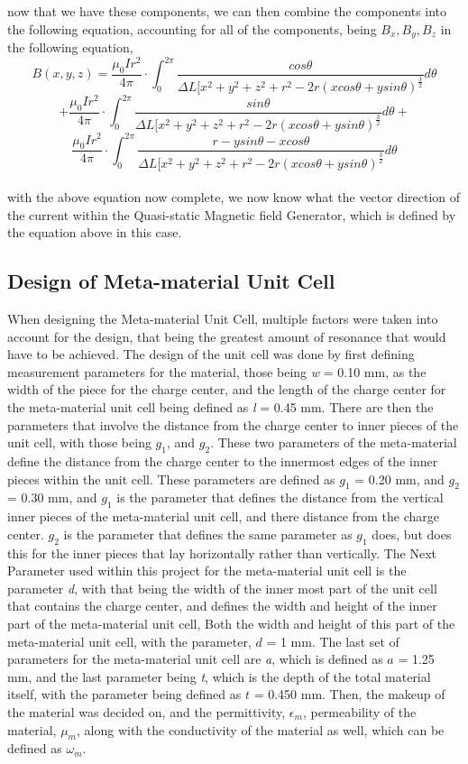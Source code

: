 \documentclass[]{article}
\begin{document}
now that we have these components, we can then combine the components into the following equation, accounting for all of the components, being $B_x, B_y, B_z$ in the following equation,
\\
\[B(x,y,z) = \frac{\mu_0Ir^2}{4\pi} \cdot \int_{0}^{2\pi} \frac{cos\theta}{\Delta{L}[x^2+y^2+z^2+r^2-2r(xcos\theta+ysin\theta)^\frac{3}{2}}d\theta\]
\[+ \frac{\mu_0Ir^2}{4\pi} \cdot \int_{0}^{2\pi} \frac{sin\theta}{\Delta{L}[x^2+y^2+z^2+r^2-2r(xcos\theta+ysin\theta)^\frac{3}{2}}d\theta +\]
\[\frac{\mu_0Ir^2}{4\pi} \cdot \int_{0}^{2\pi} \frac{r-ysin\theta-xcos\theta}{\Delta{L}[x^2+y^2+z^2+r^2-2r(xcos\theta+ysin\theta)^\frac{3}{2}}d\theta\]
\\
with the above equation now complete, we now know what the vector direction of the current within the Quasi-static Magnetic field Generator, which is defined by the equation above in this case.
\subsection{Design of Meta-material Unit Cell}
When designing the Meta-material Unit Cell, multiple factors were taken into account for the design, that being the greatest amount of resonance that would have to be achieved. The design of the unit cell was done by first defining measurement parameters for the material, those being \textit{w} = 0.10 mm, as the width of the piece for the charge center, and the length of the charge center for the meta-material unit cell being defined as \textit{l} = 0.45 mm. There are then the parameters that involve the distance from the charge center to inner pieces of the unit cell, with those being $g_{1}$, and $g_{2}$. These two parameters of the meta-material define the distance from the charge center to the innermost edges of the inner pieces within the unit cell. These parameters are defined as $g_{1}$ = 0.20 mm, and $g_{2}$ = 0.30 mm, and $g_{1}$ is the parameter that defines the distance from the vertical inner pieces of the meta-material unit cell, and there distance from the charge center. $g_{2}$ is the parameter that defines the same parameter as $g_{1}$ does, but does this for the inner pieces that lay horizontally rather than vertically. The Next Parameter used within this project for the meta-material unit cell is the parameter \textit{d}, with that being the width of the inner most part of the unit cell that contains the charge center, and defines the width and height of the inner part of the meta-material unit cell, Both the width and height of this part of the meta-material unit cell, with the parameter, $d$ = 1 mm. The last set of parameters for the meta-material unit cell are \textit{a}, which is defined as $a$ = 1.25 mm, and the last parameter being \textit{t}, which is the depth of the total material itself, with the parameter being defined as $t$ = 0.450 mm. Then, the makeup of the material was decided on, and the permittivity, $\epsilon_m$, permeability of the material, $\mu_m$, along with the conductivity of the material as well,  which can be defined as $\omega_m$.
\end{document}
